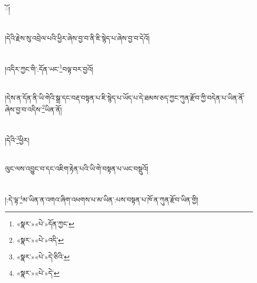 ོ།\chapter{ }།དེའི་རྗེས་སུ་འབྲེལ་པའི་ཕྱིར་ཞེས་བྱ་བ་ནི་ཇི་སྙེད་པ་ཞེས་བྱ་བ་དེའོ།\chapter{ }།འདིར་ཀྱང་གི་:དོན་ཡང་\footnote{«སྣར་»«པེ་»དོན་ཀྱང་}བལྟ་བར་བྱའོ།\chapter{ }།དེས་ན་དོན་ནི་ཡི་གེའི་སྒྲ་དང་བརྡ་བསྟན་པ་ཇི་སྙེད་པ་ཡོད་པ་དེ་ཐམས་ཅད་ཀྱང་ཀུན་རྫོབ་ཀྱི་བདེན་པ་ཡིན་ནོ་ཞེས་བྱ་བ་འདིས་\footnote{«སྣར་»«པེ་»འདི་}ཡིན་ནོ།\chapter{ }།དེའི་\footnote{«སྣར་»«པེ་»དེ་ཅིའི་}ཕྱིར།\chapter{ }ལུང་ལས་འབྱུང་བ་དང་འཇིག་རྟེན་པའི་ཡི་གེ་བསྟན་པ་ཡང་བསྡུའོ།\chapter{ }།:དེ་ལྟ་\footnote{«སྣར་»«པེ་»དེ་}མ་ཡིན་ན་འགའ་ཞིག་འཕགས་པ་མ་ཡིན་:པས་བསྟན་པ་ཁོ་ན་ཀུན་རྫོབ་ཡིན་གྱི།\chap